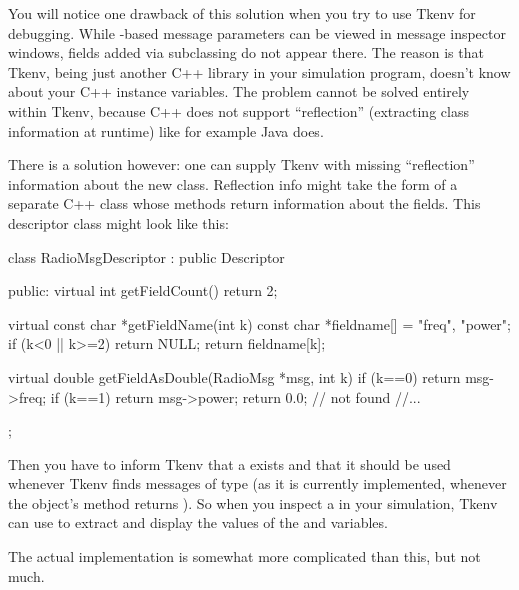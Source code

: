 
You will notice one drawback of this solution when you try to use
Tkenv for debugging. While -based message parameters can be viewed in
message inspector windows, fields added via subclassing do not appear
there. The reason is that Tkenv, being just another C++ library in your
simulation program, doesn't know about your C++ instance variables.
The problem cannot be solved entirely within Tkenv, because C++ does not
support ``reflection'' (extracting class information at runtime)
like for example Java does.

There is a solution however: one can supply Tkenv with missing ``reflection''
information about the new class. Reflection info might take the form of
a separate C++ class whose methods return information about the
 fields. This descriptor class might look like this:

\begin{cpp}
class RadioMsgDescriptor : public Descriptor
{
  public:
    virtual int getFieldCount() {return 2;}

    virtual const char *getFieldName(int k) {
        const char *fieldname[] = {"freq", "power";}
        if (k<0 || k>=2) return NULL;
        return fieldname[k];
    }

    virtual double getFieldAsDouble(RadioMsg *msg, int k) {
        if (k==0) return msg->freq;
        if (k==1) return msg->power;
        return 0.0; // not found
    }
    //...
};
\end{cpp}

Then you have to inform Tkenv that a  exists and that it
should be used whenever Tkenv finds messages of type  (as it is
currently implemented, whenever the object's  method returns
). So when you inspect a  in your simulation, Tkenv
can use  to extract and display the values of
the  and  variables.

The actual implementation is somewhat more complicated than this, but not
much.

